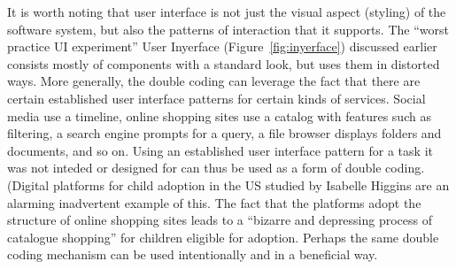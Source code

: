 It is worth noting that user interface is not just the visual aspect (styling) of the software
system, but also the patterns of interaction that it supports. The ``worst practice UI experiment''
User Inyerface (Figure~\ref{fig:inyerface}) discussed earlier consists mostly of components with a
standard look, but uses them in distorted ways. More generally, the double coding can leverage
the fact that there are certain established user interface patterns for certain kinds of services.
Social media use a timeline, online shopping sites use a catalog with features such as filtering,
a search engine prompts for a query, a file browser displays folders and documents, and so on.
Using an established user interface pattern for a task it was not inteded or designed for can
thus be used as a form of double coding. (Digital platforms for child adoption in the US
studied by Isabelle Higgins are an alarming inadvertent example of this. The fact that the
platforms adopt the structure of online shopping sites leads to a ``bizarre and depressing process
of catalogue shopping'' for children eligible for adoption.
Perhaps the same double coding mechanism can be used intentionally and in a beneficial way.

